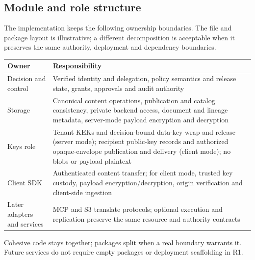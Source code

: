 \subsection{Module and role structure}
The implementation keeps the following ownership boundaries. The file and package layout is illustrative; a different decomposition is acceptable when it preserves the same authority, deployment and dependency boundaries.
\begin{longtable}{@{}P{0.24\textwidth}P{0.66\textwidth}@{}}
\toprule Owner & Responsibility\\\midrule\endhead
Decision and control & Verified identity and delegation, policy semantics and release state, grants, approvals and audit authority\\
Storage & Canonical content operations, publication and catalog consistency, private backend access, document and lineage metadata, server-mode payload encryption and decryption\\
Keys role & Tenant KEKs and decision-bound data-key wrap and release (server mode); recipient public-key records and authorized opaque-envelope publication and delivery (client mode); no blobs or payload plaintext\\
Client SDK & Authenticated content transfer; for client mode, trusted key custody, payload encryption/decryption, origin verification and client-side ingestion\\
Later adapters and services & MCP and S3 translate protocols; optional execution and replication preserve the same resource and authority contracts\\
\bottomrule
\end{longtable}
Cohesive code stays together; packages split when a real boundary warrants it. Future services do not require empty packages or deployment scaffolding in R1.
